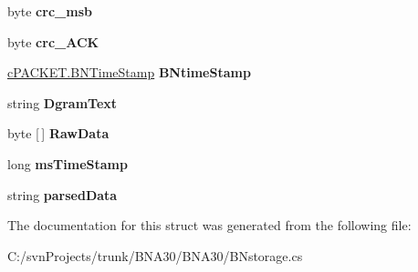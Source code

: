 \begin{DoxyCompactItemize}
byte {\bfseries crc\+\_\+msb}
\item 
\mbox{\label{struct_b_n_a30_1_1_b_nstorage_1_1_p_a_c_k_e_tstruct_ad9c0a4e40a77c0acfa83c63b853bf2f0}} 
byte {\bfseries crc\+\_\+\+A\+CK}
\item 
\mbox{\label{struct_b_n_a30_1_1_b_nstorage_1_1_p_a_c_k_e_tstruct_af99d58956e42966055eb349800865691}} 
\mbox{\hyperlink{struct_b_n_a30_1_1c_p_a_c_k_e_t_1_1_b_n_time_stamp}{c\+P\+A\+C\+K\+E\+T.\+B\+N\+Time\+Stamp}} {\bfseries B\+Ntime\+Stamp}
\item 
\mbox{\label{struct_b_n_a30_1_1_b_nstorage_1_1_p_a_c_k_e_tstruct_af38934f75924540c58eb340881eb0020}} 
string {\bfseries Dgram\+Text}
\item 
\mbox{\label{struct_b_n_a30_1_1_b_nstorage_1_1_p_a_c_k_e_tstruct_a5ec758f0173ad2be2a6ee525ff8d31b3}} 
byte \mbox{[}$\,$\mbox{]} {\bfseries Raw\+Data}
\item 
\mbox{\label{struct_b_n_a30_1_1_b_nstorage_1_1_p_a_c_k_e_tstruct_af19f52012660db41f50bdd3a5fc8bc83}} 
long {\bfseries ms\+Time\+Stamp}
\item 
\mbox{\label{struct_b_n_a30_1_1_b_nstorage_1_1_p_a_c_k_e_tstruct_ace5e13eeeafabba7818895da8f53891d}} 
string {\bfseries parsed\+Data}
\end{DoxyCompactItemize}


The documentation for this struct was generated from the following file\+:\begin{DoxyCompactItemize}
\item 
C\+:/svn\+Projects/trunk/\+B\+N\+A30/\+B\+N\+A30/B\+Nstorage.\+cs\end{DoxyCompactItemize}
